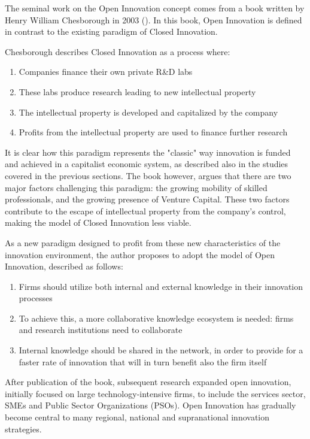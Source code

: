 \documentclass[12pt]{report}
\begin{document}
\par The seminal work on the Open Innovation concept comes from a book written by Henry William Chesborough in 2003 (\cite{Chesbrough_2003}). In this book, Open Innovation is defined in contrast to the existing paradigm of Closed Innovation.
\par Chesborough describes Closed Innovation as a process where:
\begin{enumerate}
    \item Companies finance their own private R\&D labs
    \item These labs produce research leading to new intellectual property
    \item The intellectual property is developed and capitalized by the company
    \item Profits from the intellectual property are used to finance further research
\end{enumerate}
\par It is clear how this paradigm represents the "classic" way innovation is funded and achieved in a capitalist economic system, as described also in the studies covered in the previous sections. The book however, argues that there are two major factors challenging this paradigm: the growing mobility of skilled professionals, and the growing presence of Venture Capital. These two factors contribute to the escape of intellectual property from the company's control, making the model of Closed Innovation less viable. 
\par As a new paradigm designed to profit from these new characteristics of the innovation environment, the author proposes to adopt the model of Open Innovation, described as follows:
\begin{enumerate}
    \item Firms should utilize both internal and external knowledge in their innovation processes
    \item To achieve this, a more collaborative knowledge ecosystem is needed: firms and research institutions need to collaborate
    \item Internal knowledge should be shared in the network, in order to provide for a faster rate of innovation that will in turn benefit also the firm itself
\end{enumerate}
\par After publication of the book, subsequent research expanded open innovation, initially focused on large technology-intensive firms, to include the services sector, SMEs and Public Sector Organizations (PSOs). Open Innovation has gradually become central to many regional, national and supranational innovation strategies.
\end{document}
